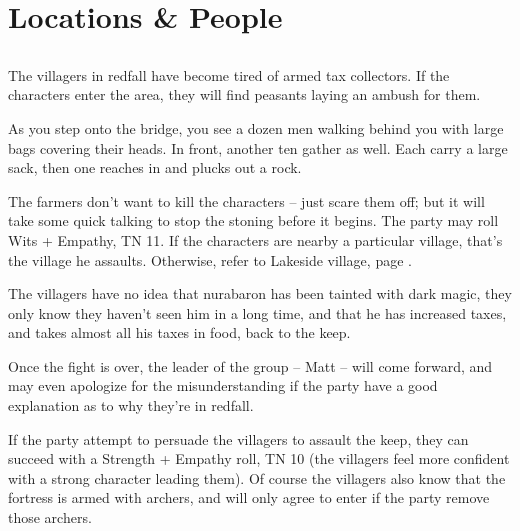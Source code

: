 \section{Locations \& People}

\label{redfall_map}

\subsection{}

\begin{multicols}{2}

\noindent The villagers in \gls{redfall} have become tired of armed tax collectors.  If the characters enter the area, they will find peasants laying an ambush for them.

\begin{boxtext}

	As you step onto the bridge, you see a dozen men walking behind you with large bags covering their heads.  In front, another ten gather as well.  Each carry a large sack, then one reaches in and plucks out a rock.

\end{boxtext}

The farmers don't want to kill the characters -- just scare them off; but it will take some quick talking to stop the stoning before it begins.  The party may roll Wits + Empathy, TN 11.
If the characters are nearby a particular village, that's the village he assaults.
Otherwise, refer to Lakeside village, page \pageref{lakeside}.

The villagers have no idea that \gls{nurabaron} has been tainted with dark magic, they only know they haven't seen him in a long time, and that he has increased taxes, and takes almost all his taxes in food, back to the keep.


Once the fight is over, the leader of the group -- Matt -- will come forward, and may even apologize for the misunderstanding if the party have a good explanation as to why they're in \gls{redfall}.

If the party attempt to persuade the villagers to assault the keep, they can succeed with a Strength + Empathy roll, TN 10
(the villagers feel more confident with a strong character leading them).
Of course the villagers also know that the fortress is armed with archers, and will only agree to enter if the party remove those archers.


\end{multicols}
